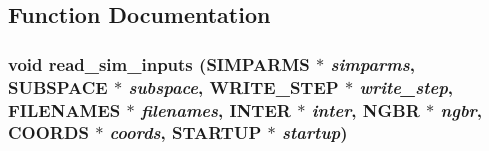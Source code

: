 \subsection{Function Documentation}
\subsubsection{\setlength{\rightskip}{0pt plus 5cm}void read\_\-sim\_\-inputs ({\bf SIMPARMS} $\ast$ {\em simparms}, {\bf SUBSPACE} $\ast$ {\em subspace}, {\bf WRITE\_\-STEP} $\ast$ {\em write\_\-step}, {\bf FILENAMES} $\ast$ {\em filenames}, {\bf INTER} $\ast$ {\em inter}, {\bf NGBR} $\ast$ {\em ngbr}, {\bf COORDS} $\ast$ {\em coords}, {\bf STARTUP} $\ast$ {\em startup})}\label{input_2md__readsim_8c_edbd265231f32e7e018beacafed09f18}


